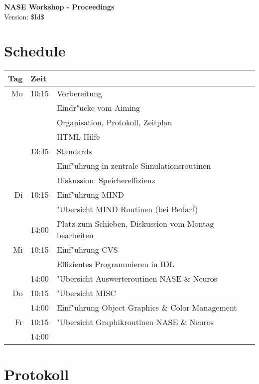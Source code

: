 \documentclass[12pt]{article}
\begin{document}
\begin{center}
{\Huge\textbf{NASE Workshop - Proceedings}}\\[2cm]
Version: \$Id$ $\$ 
\end{center}


\section{Schedule}

\begin{center}
\begin{tabular}{|r|l|l|}  \hline
  Tag & Zeit  & \\ 
\hline\hline
  Mo & 10:15 & Vorbereitung\\
     &       & Eindr"ucke vom Aiming\\
     &       & Organisation, Protokoll, Zeitplan\\
     &       & HTML Hilfe\\
     & 13:45 & Standards\\
     &       & Einf"uhrung in zentrale Simulationsroutinen\\
     &       & Diskussion: Speichereffizienz\\
\hline\hline
  Di & 10:15 & Einf"uhrung MIND\\ 
     &       & "Ubersicht MIND Routinen (bei Bedarf)\\ 
     & 14:00 & Platz zum Schieben, Diskussion vom Montag bearbeiten\\ 
\hline\hline
  Mi & 10:15 & Einf"uhrung CVS\\
     &       & Effizientes Programmieren in IDL\\
     & 14:00 & "Ubersicht Auswerteroutinen NASE \& Neuros\\
\hline\hline
  Do & 10:15 & "Ubersicht MISC \\
     & 14:00 & Einf"uhrung Object Graphics \& Color Management \\ \hline\hline
  Fr & 10:15 & "Ubersicht Graphikroutinen NASE \& Neuros\\
     & 14:00 &  \\ \hline
\end{tabular}

\end{center}



\section{Protokoll}
\end{document}
